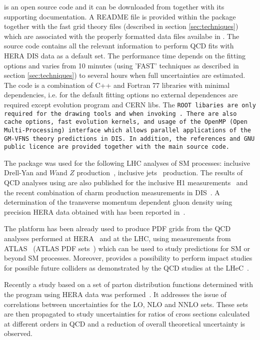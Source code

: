 
\fitter is an open source code and it can be downloaded from \cite{herafitter:page}
together with its supporting documentation. A README file is provided within the package together with the fast grid theory files (described in section \ref{sec:techniques}) which are associated with the properly formatted data files availabe in \fitter.
The source code contains all the relevant information to perform QCD fits with HERA DIS data as a default set. The performance time depends on the fitting options and varies from 10 minutes 
(using 'FAST' techniques as described in section \ref{sec:techniques}) to several hours when full uncertainties are estimated. The \fitter code is a combination of C++ and Fortran 77 libraries with minimal 
dependencies, i.e. for the default fitting options no external dependences are required  except \qcdnum evolution program \cite{qcdnum} and CERN libs. The \tt ROOT \rm  libaries are only required for the drawing tools and when invoking \applgrid\rm.  
There are also cache options, fast evolution kernels, and usage of the OpenMP (Open Multi-Processing)  interface which allows parallel applications of the GM-VFNS theory predictions in DIS. 
In addition, the \fitter references and GNU public licence are provided 
together with the main source code. 


The \fitter package was used for the following LHC analyses of SM processes:
inclusive Drell-Yan and $W$and $Z$ 
production~\cite{atlas:strange,atlas:hm,cms:strange},
inclusive jets~\cite{atlas:jets,cms:jets} production.
The results of QCD analyses using \fitter are also
published for the inclusive H1 measurements~\cite{h1:2012kk}
and the recent combination of charm production measurements 
in DIS~\cite{h1zeus:charm}.
A determination of the transverse momentum dependent gluon density using precision HERA data obtained with \fitter has been reported in~\cite{Jung2014}. 


The \fitter platform has been already used to produce PDF grids 
from the QCD analyses performed at 
HERA~\cite{h1zeus:2009wt,hera:grids} and at the LHC, using 
measurements from ATLAS~\cite{atlas:strange,atlas:jets} (ATLAS PDF sets~\cite{atlas:grids}) which can be used to study predictions for SM or beyond SM processes.  Moreover, \fitter provides a possibility to 
perform impact studies for possible future colliders
as demonstrated by the QCD studies at the LHeC~\cite{lhec:studies}.

Recently a study based on a set of parton distribution functions 
determined with the \fitter program using HERA data was performed~\cite{hfcorrpaper}. It addresses the issue of correlations between uncertainties for the LO,
NLO and NNLO sets. These sets are then propagated to study uncertainties 
for ratios of cross sections calculated at different orders in QCD and  
a reduction of overall theoretical uncertainty is observed.








